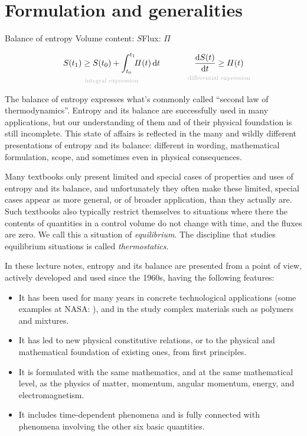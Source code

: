 \documentclass[a4paper,12pt,%
onecolumn,oneside,%
british%
]{memoir}
\newcommand*{\di}{\mathop{}\!\mathrm{d}}%
\renewcommand*{\|}[1][]{\nonscript\:#1\vert\nonscript\:\mathopen{}}
\newcommand*{\yti}{t_{0}}
\newcommand*{\ytf}{t_{1}}
\newcommand*{\dt}{\di t}
\newcommand*{\yS}{S}
\newcommand*{\yB}{\varPi}
\begin{document}
\section{Formulation and generalities}
\label{sec:bal_entropy_formulation}


\begin{definition}{Balance of entropy}
  Volume content: $\yS$\qquad Flux: $\yB$


  \begin{equation}
    \label{eq:bal_entropy}
      \underbracket[0pt]{\yS(\ytf) \ge \yS(\yti) + \int_{\yti}^{\ytf}\!\!\yB(t)\dt}_{\mathclap{\text{\color{grey}integral expression}}}
      \qquad%
      \qquad
      \underbracket[0pt]{\frac{\di\yS(t)}{\dt} \ge \yB(t)}_{\mathclap{\text{\color{grey}differential expression}}}
  \end{equation}
\end{definition}


The balance of entropy expresses what's commonly called \enquote{second law of thermodynamics}. Entropy and its balance are successfully used in many applications, but our understanding of them and of their physical foundation is still incomplete. This state of affairs is reflected in the many and wildly different presentations of entropy and its balance: different in wording, mathematical formulation, scope, and sometimes even in physical consequences.

Many textbooks only present limited and special cases of properties and uses of entropy and its balance, and unfortunately they often make these limited, special cases appear as more general, or of broader application, than they actually are. Such textbooks also typically restrict themselves to situations where there the contents of quantities in a control volume do not change with time, and the fluxes are zero. We call this a situation of \emph{equilibrium}. The discipline that studies equilibrium situations is called \emph{thermostatics}.

In these lecture notes, entropy and its balance are presented from a point of view, actively developed and used since the 1960s, having the following features:
\begin{itemize}[nosep]
\item It has been used for many years in concrete technological applications (some examples at NASA: \cites{changetal1971,hughesetal1986,turonetal2004,diosadyetal2018,katoetal2020}),
  and in the study complex materials such as polymers and mixtures.
\item It has led to new physical constitutive relations, or to the physical and mathematical foundation of existing ones, from first principles.
\item It is formulated with the same mathematics, and at the same mathematical level, as the physics of matter, momentum, angular momentum, energy, and electromagnetism.
\item It includes time-dependent phenomena and is fully connected with phenomena involving the other six basic quantities.
\end{itemize}
\end{document}
